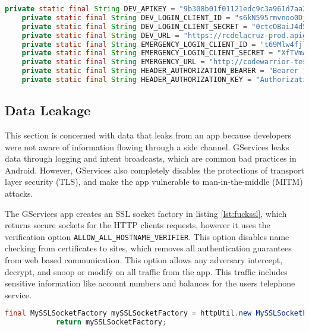 \documentclass[conference,compsoc]{IEEEtran}
\begin{document}
\begin{lstlisting}[language=Java, caption=HttpUtil snippets of sensitive data, label={lst:snips2}]
private static final String DEV_APIKEY = "9b308b01f01121edc9c3a961d7aa2015";
    private static final String DEV_LOGIN_CLIENT_ID = "s6kN595rmvnoo0DjwhkWON0tXAVmL6GB";
    private static final String DEV_LOGIN_CLIENT_SECRET = "0ctcOBaiJ4d5ES5n";
    private static final String DEV_URL = "https://rcdelacruz-prod.apigee.net/v2/greygoose-dev";
    private static final String EMERGENCY_LOGIN_CLIENT_ID = "t69Mlw4fjTQlpTs7OWcGawpVgdvvf6jy";
    private static final String EMERGENCY_LOGIN_CLIENT_SECRET = "XfTVmA5XFX6hIfjr";
    private static final String EMERGENCY_URL = "http://codewarrior-test.apigee.net/hello-world";
    private static final String HEADER_AUTHORIZATION_BEARER = "Bearer ";
    private static final String HEADER_AUTHORIZATION_KEY = "Authorization";
\end{lstlisting}


\subsection{Data Leakage}
This section is concerned with data that leaks from an app because developers were not aware of information flowing through a side channel. GServices leaks data through logging and intent broadcasts, which are common bad practices in Android. However, GServices also completely disables the protections of transport layer security (TLS), and make the app vulnerable to man-in-the-middle (MITM) attacks.

The GServices app creates an SSL socket factory in listing \ref{lst:fuckssl}, which returns secure sockets for the HTTP clients requests, however it uses the  verification option \texttt{ALLOW\_ALL\_HOSTNAME\_VERIFIER}. This option disables name checking \cite{Google:hostname} from certificates to sites, which removes all authentication guarantees from web based communication. This option allows any adversary intercept, decrypt, and snoop or modify on all traffic from the app. This traffic includes sensitive information like account numbers and balances for the users telephone service.

\begin{lstlisting}[language=Java, caption=Insecure name checking mode in SSL options, label={lst:fuckssl}]
final MySSLSocketFactory mySSLSocketFactory = httpUtil.new MySSLSocketFactory(instance);            mySSLSocketFactory.setHostnameVerifier(MySSLSocketFactory.ALLOW_ALL_HOSTNAME_VERIFIER);
            return mySSLSocketFactory;
\end{lstlisting}
\end{document}
